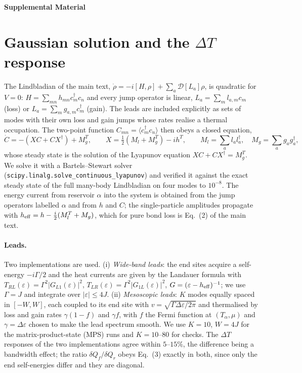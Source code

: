 \documentclass[reprint,aps,prl,superscriptaddress,nofootinbib,floatfix]{revtex4-2}
\newcommand{\dQ}{\delta Q}
\newcommand{\heff}{h_{\rm eff}}
\begin{document}
\clearpage
\onecolumngrid
\begin{center}{\large\bfseries Supplemental Material}\end{center}
\setcounter{section}{0}\setcounter{table}{0}\setcounter{equation}{0}\setcounter{figure}{0}
\renewcommand{\thesection}{S\arabic{section}}
\renewcommand{\thetable}{S\arabic{table}}
\renewcommand{\theequation}{S\arabic{equation}}
\renewcommand{\thefigure}{S\arabic{figure}}
\setcounter{secnumdepth}{2}


\section{Gaussian solution and the $\Delta T$ response}
\label{sec:gauss}

The Lindbladian of the main text, $\dot\rho=-i[H,\rho]+\sum_a\mathcal{D}[L_a]\rho$, is quadratic for $V=0$: $H=\sum_{mn}h_{mn}c_m^\dagger c_n$ and every jump operator is linear, $L_a=\sum_m l_{a,m}c_m$ (loss) or $L_a=\sum_m g_{a,m}c_m^\dagger$ (gain). The leads are included explicitly as sets of modes with their own loss and gain jumps whose rates realise a thermal occupation. The two-point function $C_{mn}=\langle c_m^\dagger c_n\rangle$ then obeys a closed equation,
\begin{equation}
\dot C=-(XC+CX^\dagger)+M_g^{T},\qquad X=\tfrac12(M_l+M_g^{T})-ih^{T},\qquad M_l=\sum_a l_al_a^\dagger,\quad M_g=\sum_a g_ag_a^\dagger,
\end{equation}
whose steady state is the solution of the Lyapunov equation $XC+CX^\dagger=M_g^{T}$. We solve it with a Bartels--Stewart solver (\texttt{scipy.linalg.solve\_continuous\_lyapunov}) and verified it against the exact steady state of the full many-body Lindbladian on four modes to $10^{-8}$. The energy current from reservoir $\alpha$ into the system is obtained from the jump operators labelled $\alpha$ and from $h$ and $C$; the single-particle amplitudes propagate with $\heff=h-\tfrac{i}{2}(M_l^{T}+M_g)$, which for pure bond loss is Eq.~(2) of the main text.

\paragraph{Leads.}
Two implementations are used. (i) \emph{Wide-band leads}: the end sites acquire a self-energy $-i\Gamma/2$ and the heat currents are given by the Landauer formula with $T_{RL}(\varepsilon)=\Gamma^2|G_{L1}(\varepsilon)|^2$, $T_{LR}(\varepsilon)=\Gamma^2|G_{1L}(\varepsilon)|^2$, $G=(\varepsilon-\heff)^{-1}$; we use $\Gamma=J$ and integrate over $|\varepsilon|\le4J$. (ii) \emph{Mesoscopic leads}: $K$ modes equally spaced in $[-W,W]$, each coupled to its end site with $v=\sqrt{\Gamma\Delta\varepsilon/2\pi}$ and thermalised by loss and gain rates $\gamma(1-f)$ and $\gamma f$, with $f$ the Fermi function at $(T_\alpha,\mu)$ and $\gamma=\Delta\varepsilon$ chosen to make the lead spectrum smooth. We use $K=10$, $W=4J$ for the matrix-product-state (MPS) runs and $K=10$--$80$ for checks. The $\Delta T$ responses of the two implementations agree within $5$--$15\%$, the difference being a bandwidth effect; the ratio $\dQ_f/\dQ_r$ obeys Eq.~(3) exactly in both, since only the end self-energies differ and they are diagonal.
\end{document}
